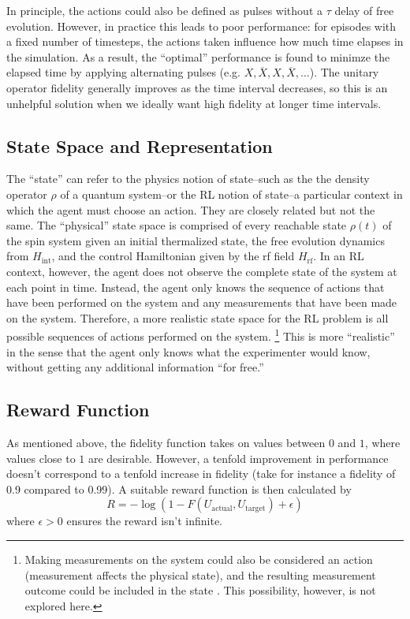 In principle, the actions could also be defined as pulses without a $\tau$ delay of free evolution. However, in practice this leads to poor performance: for episodes with a fixed number of timesteps, the actions taken influence how much time elapses in the simulation. As a result, the ``optimal'' performance is found to minimze the elapsed time by applying alternating pulses (e.g. $X, \overline{X}, X, \overline{X}, \dots$).
The unitary operator fidelity generally improves as the time interval decreases, so this is an unhelpful solution when we ideally want high fidelity at longer time intervals.

\subsection{State Space and Representation}

The ``state'' can refer to the physics notion of state--such as the the density operator $\rho$ of a quantum system--or the RL notion of state--a particular context in which the agent must choose an action. They are closely related but not the same.
The ``physical'' state space is comprised of every reachable state $\rho(t)$ of the spin system given an initial thermalized state, the free evolution dynamics from $H_{\text{int}}$, and the control Hamiltonian given by the rf field $H_{\text{rf}}$.
In an RL context, however, the agent does not observe the complete state of the system at each point in time. Instead, the agent only knows the sequence of actions that have been performed on the system and any measurements that have been made on the system.
Therefore, a more realistic state space for the RL problem is all possible sequences of actions performed on the system.%
\footnote{
Making measurements on the system could also be considered an action (measurement affects the physical state), and the resulting measurement outcome could be included in the state \cite{porotti2019coherent}. This possibility, however, is not explored here.
}
This is more ``realistic'' in the sense that the agent only knows what the experimenter would know, without getting any additional information ``for free.''

\subsection{Reward Function}

As mentioned above, the fidelity function takes on values between $0$ and $1$, where values close to $1$ are desirable.
However, a tenfold improvement in performance doesn't correspond to a tenfold increase in fidelity (take for instance a fidelity of 0.9 compared to 0.99). A suitable reward function is then calculated by
\begin{equation}
    R = -\log(1-F(U_\text{actual}, U_\text{target}) + \epsilon)
\end{equation}
where $\epsilon>0$ ensures the reward isn't infinite.

